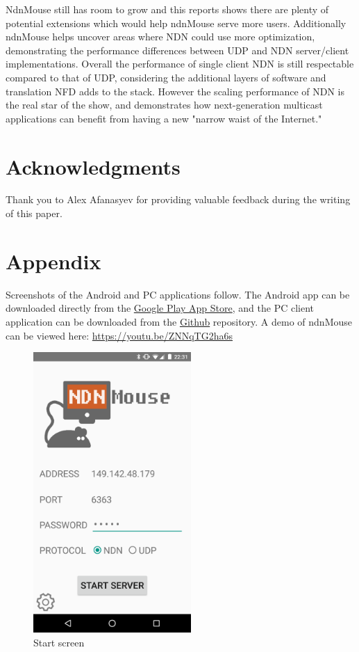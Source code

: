 \documentclass{sig-alternate}
\renewcommand\_{\textunderscore\allowbreak}  %
\begin{document}
NdnMouse still has room to grow and this reports shows there are plenty of potential extensions which would help ndnMouse serve more users. Additionally ndnMouse helps uncover areas where NDN could use more optimization, demonstrating the performance differences between UDP and NDN server/client implementations. Overall the performance of single client NDN is still respectable compared to that of UDP, considering the additional layers of software and translation NFD adds to the stack. However the scaling performance of NDN is the real star of the show, and demonstrates how next-generation multicast applications can benefit from having a new "narrow waist of the Internet."

\section{Acknowledgments}
Thank you to Alex Afanasyev for providing valuable feedback during the writing of this paper.



\section{Appendix}
\label{sec:appendix}
Screenshots of the Android and PC applications follow. The Android app can be downloaded directly from the \href{https://play.google.com/store/apps/details?id=edu.ucla.cs.ndnmouse}{Google Play App Store}, and the PC client application can be downloaded from the \href{https://github.com/wminner/ndnMouse/tree/master/pc_client}{Github} repository. A demo of ndnMouse can be viewed here: \href{https://youtu.be/ZNNqTG2ha6s}{https://youtu.be/ZNNqTG2ha6s}

\begin{figure}[hp]
	\hypertarget{fig:start}{}
	\centering
	\includegraphics[width=6cm]{screenshots/start}
	\caption{Start screen}
\end{figure}
\end{document}
